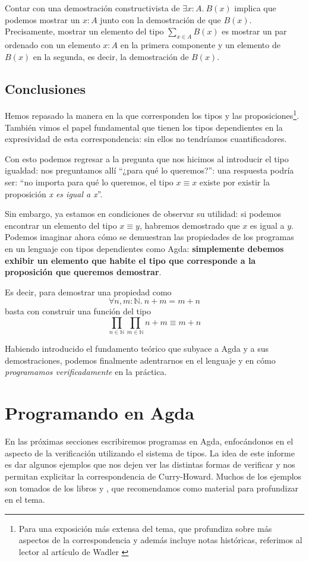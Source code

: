 \documentclass[11pt]{article} %
\begin{document}
Contar con una demostración constructivista de $∃ x:A .\ B(x)$ implica que podemos mostrar un $x : A$ junto con la demostración de que $B(x)$. Precisamente, mostrar un elemento del tipo $\sum_{x\in A} B(x)$ es mostrar un par ordenado con un elemento $x : A$ en la primera componente y un elemento de $B(x)$ en la segunda, es decir, la demostración de $B(x)$.

\subsection{Conclusiones}
Hemos repasado la manera en la que corresponden los tipos y las proposiciones\footnote{Para una exposición más extensa del tema, que profundiza sobre más aspectos de la correspondencia y además incluye notas históricas, referimos al lector al artículo de Wadler \cite{wadler2015propositions}}. También vimos el papel fundamental que tienen los tipos dependientes en la expresividad de esta correspondencia: sin ellos no tendríamos cuantificadores.

Con esto podemos regresar a la pregunta que nos hicimos al introducir el tipo igualdad: nos preguntamos allí ``¿para qué lo queremos?'': una respuesta podría ser: ``no importa para qué lo queremos, el tipo $x \equiv x$ existe por existir la proposición \textit{x es igual a x}''. 

Sin embargo, ya estamos en condiciones de observar su utilidad: si podemos encontrar un elemento del tipo $x ≡ y$, habremos demostrado que $x$ es igual a $y$. Podemos imaginar ahora cómo se demuestran las propiedades de los programas en un lenguaje con tipos dependientes como Agda: \textbf{simplemente debemos exhibir un elemento que habite el tipo que corresponde a la proposición que queremos demostrar}. 

Es decir, para demostrar una propiedad como \[ \forall n,m : \mathbb{N} .\ n + m = m + n  \] basta con construir una función del tipo \[ \prod_{n ∈ \mathbb{N}}\prod_{m ∈ \mathbb{N}} n + m ≡ m + n \]

Habiendo introducido el fundamento teórico que subyace a Agda y a sus demostraciones, podemos finalmente adentrarnos en el lenguaje y en cómo \textit{programamos verificadamente} en la práctica. 

\section{Programando en Agda}
En las próximas secciones escribiremos programas en Agda, enfocándonos en el aspecto de la verificación utilizando el sistema de tipos. La idea de este informe es dar algunos ejemplos que nos dejen ver las distintas formas de verificar y nos permitan explicitar la correspondencia de Curry-Howard. Muchos de los ejemplos son tomados de los libros \cite{Stump16} y \cite{plfa2019}, que recomendamos como material para profundizar en el tema. 
\end{document}
